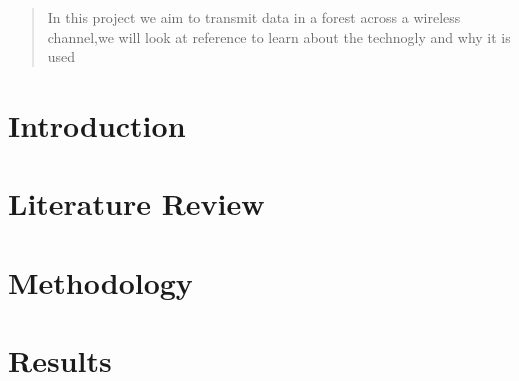 \documentclass[11pt]{report}
\begin{document}


\newpage
\tableofcontents
\listoffigures
\listoftables
\lstlistoflistings
\newpage

\begin{abstract}
  In this project we aim to transmit data in a forest across a wireless channel,we will look at reference to learn about the technogly and why it is  used 
\end{abstract}
\chapter{Introduction}

% 

\chapter{Literature Review}

\chapter{Methodology}

\chapter{Results}





\newpage
{}


\end{document}
